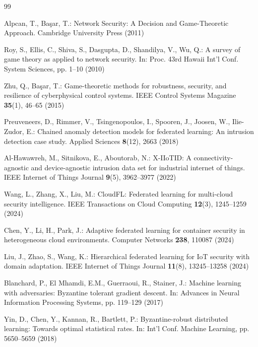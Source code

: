 \documentclass[12pt,a4paper]{article}
\theoremstyle{definition}
\begin{document}

\begin{thebibliography}{99}

Alpcan, T., Başar, T.: Network Security: A Decision and Game-Theoretic Approach. Cambridge University Press (2011)

Roy, S., Ellis, C., Shiva, S., Dasgupta, D., Shandilya, V., Wu, Q.: A survey of game theory as applied to network security. In: Proc. 43rd Hawaii Int'l Conf. System Sciences, pp. 1--10 (2010)

Zhu, Q., Başar, T.: Game-theoretic methods for robustness, security, and resilience of cyberphysical control systems. IEEE Control Systems Magazine \textbf{35}(1), 46--65 (2015)

Preuveneers, D., Rimmer, V., Tsingenopoulos, I., Spooren, J., Joosen, W., Ilie-Zudor, E.: Chained anomaly detection models for federated learning: An intrusion detection case study. Applied Sciences \textbf{8}(12), 2663 (2018)

Al-Hawawreh, M., Sitnikova, E., Aboutorab, N.: X-IIoTID: A connectivity-agnostic and device-agnostic intrusion data set for industrial internet of things. IEEE Internet of Things Journal \textbf{9}(5), 3962--3977 (2022)

Wang, L., Zhang, X., Liu, M.: CloudFL: Federated learning for multi-cloud security intelligence. IEEE Transactions on Cloud Computing \textbf{12}(3), 1245--1259 (2024)

Chen, Y., Li, H., Park, J.: Adaptive federated learning for container security in heterogeneous cloud environments. Computer Networks \textbf{238}, 110087 (2024)

Liu, J., Zhao, S., Wang, K.: Hierarchical federated learning for IoT security with domain adaptation. IEEE Internet of Things Journal \textbf{11}(8), 13245--13258 (2024)

Blanchard, P., El Mhamdi, E.M., Guerraoui, R., Stainer, J.: Machine learning with adversaries: Byzantine tolerant gradient descent. In: Advances in Neural Information Processing Systems, pp. 119--129 (2017)

Yin, D., Chen, Y., Kannan, R., Bartlett, P.: Byzantine-robust distributed learning: Towards optimal statistical rates. In: Int'l Conf. Machine Learning, pp. 5650--5659 (2018)


\end{thebibliography}
\end{document}
